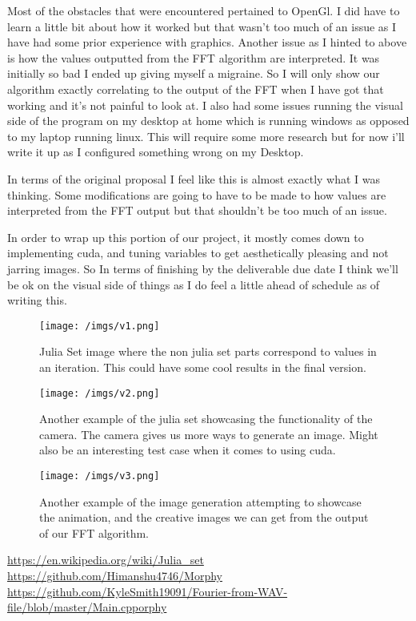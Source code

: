 \documentclass{article}
\begin{document}
\par Most of the obstacles that were encountered pertained to OpenGl. I did have to learn a little bit about how it worked but that wasn’t too much of an issue as I have had some prior experience with graphics. Another issue as I hinted to above is how the values outputted from the FFT algorithm are interpreted. It was initially so bad I ended up giving myself a migraine. So I will only show our algorithm exactly correlating to the output of the FFT when I have got that working and it’s not painful to look at. I also had some issues running the visual side of the program on my desktop at home which is running windows as opposed to my laptop running linux. This will require some more research but for now i’ll write it up as I configured something wrong on my Desktop.
\par In terms of the original proposal I feel like this is almost exactly what I was thinking. Some modifications are going to have to be made to how values are interpreted from the FFT output but that shouldn’t be too much of an issue. 
\par In order to wrap up this portion of our project, it mostly comes down to implementing cuda, and tuning variables to get aesthetically pleasing and not jarring images. So In terms of finishing by the deliverable due date I think we’ll be ok on the visual side of things as I do feel a little ahead of schedule as of writing this.
\begin{figure}[!hbt]
    \centering
\texttt{[image: /imgs/v1.png]}
\caption{Julia Set image where the non julia set parts correspond to values in an iteration. 
This could have some cool results in the final version.}
\end{figure}

\begin{figure}[!hbt]
    \centering
    \texttt{[image: /imgs/v2.png]}
    \caption{Another example of the julia set showcasing the functionality of the camera.
    The camera gives us more ways to generate an image. Might also be an interesting test case
    when it comes to using cuda.}
\end{figure}


\begin{figure}[!hbt]
    \centering
    \texttt{[image: /imgs/v3.png]}
    \caption{Another example of the image generation attempting to showcase the animation,
    and the creative images we can get from the output of our FFT algorithm.}
\end{figure}

\pagebreak
\begin{thebibliography}{9}
 \url{https://en.wikipedia.org/wiki/Julia_set} 
 \url{https://github.com/Himanshu4746/Morphy}
 \url{https://github.com/KyleSmith19091/Fourier-from-WAV-file/blob/master/Main.cpporphy}
\end{thebibliography}
\end{document}
